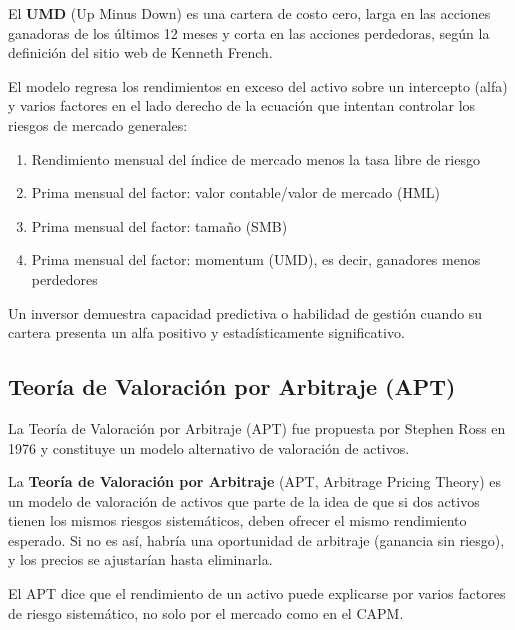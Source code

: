 \begin{definicion}
El \textbf{UMD} (Up Minus Down) es una cartera de costo cero, larga en las acciones ganadoras de los últimos 12 meses y corta en las acciones perdedoras, según la definición del sitio web de Kenneth French.
\end{definicion}

El modelo regresa los rendimientos en exceso del activo sobre un intercepto (alfa) y varios factores en el lado derecho de la ecuación que intentan controlar los riesgos de mercado generales:
\begin{enumerate}
\item Rendimiento mensual del índice de mercado menos la tasa libre de riesgo
\item Prima mensual del factor: valor contable/valor de mercado (HML)
\item Prima mensual del factor: tamaño (SMB)
\item Prima mensual del factor: momentum (UMD), es decir, ganadores menos perdedores
\end{enumerate}

Un inversor demuestra capacidad predictiva o habilidad de gestión cuando su cartera presenta un alfa positivo y estadísticamente significativo.

\subsection{Teoría de Valoración por Arbitraje (APT)}

La Teoría de Valoración por Arbitraje (APT) fue propuesta por Stephen Ross en 1976 y constituye un modelo alternativo de valoración de activos.

\begin{definicion}
La \textbf{Teoría de Valoración por Arbitraje} (APT, Arbitrage Pricing Theory) es un modelo de valoración de activos que parte de la idea de que si dos activos tienen los mismos riesgos sistemáticos, deben ofrecer el mismo rendimiento esperado. Si no es así, habría una oportunidad de arbitraje (ganancia sin riesgo), y los precios se ajustarían hasta eliminarla.
\end{definicion}

El APT dice que el rendimiento de un activo puede explicarse por varios factores de riesgo sistemático, no solo por el mercado como en el CAPM.

